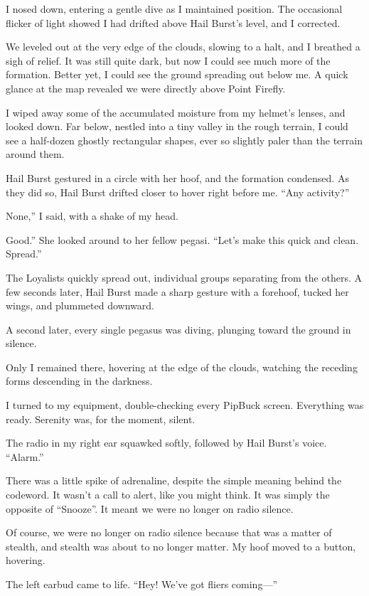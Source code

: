 I nosed down, entering a gentle dive as I maintained position. The occasional flicker of light showed I had drifted above Hail Burst’s level, and I corrected.

We leveled out at the very edge of the clouds, slowing to a halt, and I breathed a sigh of relief. It was still quite dark, but now I could see much more of the formation. Better yet, I could see the ground spreading out below me. A quick glance at the map revealed we were directly above Point Firefly.

I wiped away some of the accumulated moisture from my helmet’s lenses, and looked down. Far below, nestled into a tiny valley in the rough terrain, I could see a half-dozen ghostly rectangular shapes, ever so slightly paler than the terrain around them.

Hail Burst gestured in a circle with her hoof, and the formation condensed. As they did so, Hail Burst drifted closer to hover right before me. “Any activity?”

\leavevmode{}None,” I said, with a shake of my head.

\leavevmode{}Good.” She looked around to her fellow pegasi. “Let’s make this quick and clean. Spread.”

The Loyalists quickly spread out, individual groups separating from the others. A few seconds later, Hail Burst made a sharp gesture with a forehoof, tucked her wings, and plummeted downward.

A second later, every single pegasus was diving, plunging toward the ground in silence.

Only I remained there, hovering at the edge of the clouds, watching the receding forms descending in the darkness.

I turned to my equipment, double-checking every PipBuck screen. Everything was ready. Serenity was, for the moment, silent.

The radio in my right ear squawked softly, followed by Hail Burst’s voice. “Alarm.”

There was a little spike of adrenaline, despite the simple meaning behind the codeword. It wasn’t a call to alert, like you might think. It was simply the opposite of “Snooze”. It meant we were no longer on radio silence.

Of course, we were no longer on radio silence because that was a matter of stealth, and stealth was about to no longer matter. My hoof moved to a button, hovering.

The left earbud came to life. “Hey! We’ve got fliers coming—”

